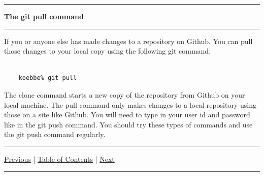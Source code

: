 \documentclass[10pt,fleqn]{article}
\begin{document}
\vskip0.1in\hrule\vskip0.1in\noindent
{\bf The git pull command} 
\vskip0.1in\hrule\vskip0.1in\noindent
If you or anyone else has made changes to a repository on Github. You can pull
those changes to your local copy using the following git command.
\begin{verbatim}

    koebbe% git pull

\end{verbatim}
The clone command starts a new copy of the repository from Github on your local
machine. The pull command only makes changes to a local repository using those
on a site like Github. You will need to type in your user id and password like
in the git push command. You should try these types of commands and use the git
push command regularly.
\vskip0.1in\hrule\vskip0.1in \noindent
  \href{../../topic_07/md/topic_07.md}{Previous} |
  \href{../../toc/md/topic_toc.md}{Table of Contents} |
  \href{../../topic_09/md/topic_09.md}{Next}
\vskip0.1in\hrule\vskip0.1in \noindent
\end{document}
